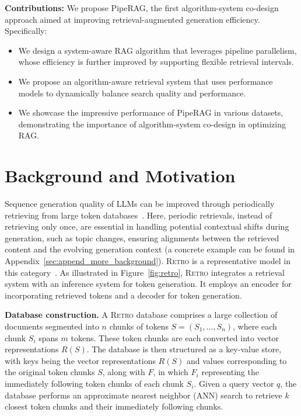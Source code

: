 \textbf{Contributions:} We propose PipeRAG, the first algorithm-system co-design approach aimed at improving retrieval-augmented generation efficiency. Specifically:
\begin{itemize}
\vspace{-0.9em}
\item We design a system-aware RAG algorithm that leverages pipeline parallelism, whose efficiency is further improved by supporting flexible retrieval intervals.
\vspace{-0.5em}
\item We propose an algorithm-aware retrieval system that uses performance models to dynamically balance search quality and performance.
\vspace{-0.5em}
\item We showcase the impressive performance of PipeRAG in various datasets, demonstrating the importance of algorithm-system co-design in optimizing RAG.
\end{itemize}

\section{Background and Motivation}
\label{sec:background}

Sequence generation quality of LLMs can be improved through periodically retrieving from large token databases~\cite{borgeaud2022improving, norlund2023generalization, ram2023context}. Here, periodic retrievals, instead of retrieving only once, are essential in handling potential contextual shifts during generation, such as topic changes, ensuring alignments between the retrieved content and the evolving generation context (a concrete example can be found in Appendix~\ref{sec:append_more_background}). 
\textsc{Retro} is a representative model in this category~\cite{borgeaud2022improving}. 
As illustrated in Figure~\ref{fig:retro}, \textsc{Retro} integrates a retrieval system with an inference system for token generation. It employs an encoder for incorporating retrieved tokens and a decoder for token generation.

\textbf{Database construction.} A \textsc{Retro} database comprises a large collection of documents segmented into \( n \) chunks of tokens \( S = (S_1, \ldots, S_n) \), where each chunk \( S_i \) spans \( m \) tokens. These token chunks are each converted into vector representations \( R(S) \). The database is then structured as a key-value store, with keys being the vector representations \( R(S) \) and values corresponding to the original token chunks \( S \), along with \( F \), in which \( F_i \) representing the immediately following token chunks of each chunk \( S_i \). Given a query vector \( q \), the database performs an approximate nearest neighbor (ANN) search to retrieve \( k \) closest token chunks and their immediately following chunks. 

